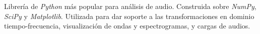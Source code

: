 Librería de \textit{Python}  más popular para análisis de audio. Construida sobre \textit{NumPy}, \textit{SciPy} y \textit{Matplotlib}. Utilizada para dar soporte a las transformaciones en dominio tiempo-frecuencia, visualización de ondas y espectrogramas, y cargas de audios.